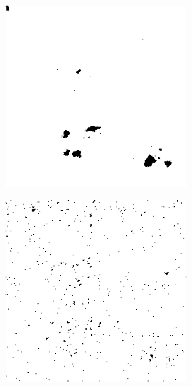 \begin{figure}[H]
\begin{minipage}[t]{0.245\textwidth}
    \label{fig:noise_5_12}
    \includegraphics[width = \textwidth]{result/noisy/1_5_0.png}
    \label{fig:noise_5_12}
\end{minipage}
\begin{minipage}[t]{0.245\textwidth}
    \includegraphics[width = \textwidth]{result/noisy/1_15_20.png}

\end{minipage}
\end{figure}
